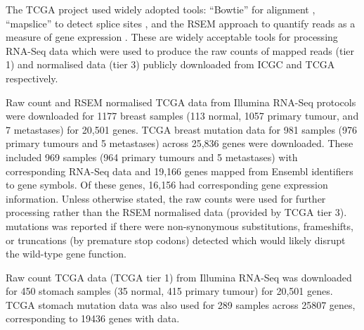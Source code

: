 The \gls{TCGA} project \citep{TCGA2012} used widely adopted tools: ``Bowtie''  for alignment \citep{bowtie}, ``mapslice'' to detect splice sites \citep{mapsplice}, and the \gls{RSEM} approach to quantify reads as a measure of \gls{gene expression} \citep{RSEM}. These are widely acceptable tools for processing \gls{RNA-Seq} data which were used to produce the raw counts of mapped reads (tier 1) and normalised  data (tier 3) publicly downloaded from \gls{ICGC} and \gls{TCGA} respectively.

Raw count and \gls{RSEM} normalised \gls{TCGA}  data from Illumina \gls{RNA-Seq} protocols were downloaded for 1177 breast samples (113 normal, 1057 primary tumour, and 7 metastases) for 20,501 genes. \gls{TCGA} breast  \gls{mutation} data for 981 samples (976 primary tumours and 5 metastases) across 25,836 genes were downloaded. These included 969 samples (964 primary tumours and 5 metastases) with corresponding \gls{RNA-Seq}  data and 19,166 genes mapped from Ensembl identifiers to gene symbols. Of these genes, 16,156 had corresponding \gls{gene expression} information. Unless otherwise stated, the raw counts were used for further processing rather than the \gls{RSEM} normalised data (provided by \gls{TCGA} tier 3).  \glspl{mutation} was reported if there were non-synonymous substitutions, frameshifts, or truncations (by premature stop codons) detected which would likely disrupt the \gls{wild-type} gene function.

Raw count \gls{TCGA}  data (\gls{TCGA} tier 1) from Illumina \gls{RNA-Seq} was downloaded for 450 stomach samples (35 normal, 415 primary tumour) for 20,501 genes. \gls{TCGA} stomach \gls{mutation} data was also used for 289 samples across 25807 genes, corresponding to 19436 genes with  data.

